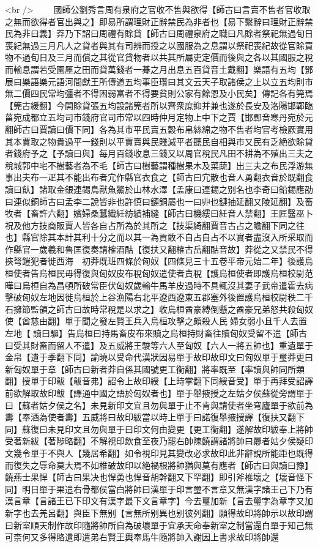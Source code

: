 <br />
　　國師公劉秀言周有泉府之官收不售與欲得【師古曰言賣不售者官收取之無而欲得者官出與之】即易所謂理財正辭禁民為非者也【易下繫辭曰理財正辭禁民為非曰義】莽乃下詔曰周禮有賖貸【師古曰周禮泉府之職曰凡賖者祭祀無過旬日喪紀無過三月凡人之貸者與其有司辨而授之以國服為之息謂以祭祀喪紀故從官賖買物不過旬日及三月而償之其從官貸物者以共其所屬吏定價而後與之各以其國服之稅而輸息謂若受園㕓之田而貸萬錢者一朞之月出息五百貸音土戴翻】樂語有五均【鄧展曰樂語樂元語河間獻王所傳道五均事臣瓚曰其文云天子取諸侯之上以立五均則市無二價四民常均彊者不得困弱富者不得要貧則公家有餘恩及小民矣】傳記各有筦焉【筦古緩翻】今開賖貸張五均設諸筦者所以齊衆庶抑并兼也遂於長安及洛陽邯鄲臨菑宛成都立五均司市錢府官司市常以四時仲月定物上中下之賈【邯鄲音寒丹宛於元翻師古曰賈讀曰價下同】各為其市平民賣五穀布帛絲綿之物不售者均官考檢厥實用其本賈取之物貴過平一錢則以平賈賣與民賤減平者聽民自相與市又民有乏絶欲賖貸者錢府予之【予讀曰與】每月百錢收息三錢又以周官稅民凡田不耕為不殖出三夫之稅城郭中宅不樹藝者為不毛【師古曰樹藝謂種樹果木及菜蔬】出三夫之布民浮游無事出夫布一疋其不能出布者宂作縣官衣食之【師古曰宂散也音人勇翻衣音於既翻食讀曰飤】諸取金銀連錫鳥獸魚鱉於山林水澤【孟康曰連錫之别名也李奇曰鉛錫應劭曰連似銅師古曰孟李二說皆非也許慎曰鏈銅屬也一曰丱也鏈抽延翻又陵延翻】及畜牧者【畜許六翻】嬪婦桑蠶織紝紡績補縫【師古曰機縷曰紝音人禁翻】王匠醫巫卜祝及他方技商販賈人皆各自占所為於其所之【技渠綺翻賈音古占之瞻翻下同之往也】縣官除其本計其利十分之而以其一為貢敢不自占自占不以實者盡沒入所采取而作縣官一歲羲和魯匡復奏請榷酒酤【復扶又翻榷古岳翻酤音故】莽從之又禁民不得挾弩鎧犯者徙西海　初莽既班四條於匈奴【四條見三十五卷平帝元始二年】後護烏桓使者告烏桓民毋得復與匈奴皮布稅匈奴遣使者責稅【護烏桓使者即護烏桓校尉范曄曰烏桓自為昌頓所破常臣伏匈奴歲輸牛馬羊皮過時不具輒沒其妻子武帝遣霍去病擊破匈奴左地因徙烏桓於上谷漁陽右北平遼西遼東五郡塞外後置護烏桓校尉秩二千石擁節監領之師古曰故時常稅是以求之】收烏桓酋豪縛倒懸之酋豪兄弟怒共殺匈奴使【酋慈由翻】單于聞之發左賢王兵入烏桓攻擊之頗殺人民婦女弱小且千人去置左地【讀曰驅】告烏桓曰持馬畜皮布來贖之烏桓持財畜往贖匈奴受留不遣【師古曰受其財畜而留人不遣】及五威將王駿等六人至匈奴【六人一將五帥也】重遺單于金帛【遺于季翻下同】諭曉以受命代漢狀因易單于故印故印文曰匈奴單于璽莽更曰新匈奴單于章【師古曰新者莽自係其國號更工衡翻】將率既至【率讀與帥同所類翻】授單于印韍【韍音弗】詔令上故印綬【上時掌翻下同綬音受】單于再拜受詔譯前欲解取故印韍【譯通中國之語於匈奴者也】單于舉掖授之左姑夕侯蘇從旁謂單于曰【蘇者姑夕侯之名】未見新印文宜且勿與單于止不肯與請使者坐穹廬單于欲前為夀【奉酒為使者夀】五威將曰故印紱當以時上單于曰諾復舉掖授譯【復扶又翻下同】蘇復曰未見印文且勿與單于曰印文何由變更【更工衡翻】遂解故印紱奉上將帥受著新紱【著陟略翻】不解視印飲食至夜乃罷右帥陳饒謂諸將帥曰曏者姑夕侯疑印文幾令單于不與人【幾居希翻】如令視印見其變改必求故印此非辭說所能距也既得而復失之辱命莫大焉不如椎破故印以絶禍根將帥猶與莫有應者【師古曰與讀曰豫】饒燕士果悍【師古曰果决也悍勇也悍音胡幹翻又下罕翻】即引斧椎壞之【壞音怪下同】明日單于果遣右骨都侯當白將帥曰漢單于印言璽不言章又無漢字諸王己下乃有漢言章【言諸王已下印文有漢字最下文言章字】今去璽加新【言去璽字為章字又加新字也去羌呂翻】與臣下無别【言無所别異也别彼列翻】願得故印將帥示以故印謂曰新室順天制作故印隨將帥所自為破壞單于宜承天命奉新室之制當還白單于知己無可柰何又多得賂遺即遣弟右賢王輿奉馬牛隨將帥入謝因上書求故印將帥還